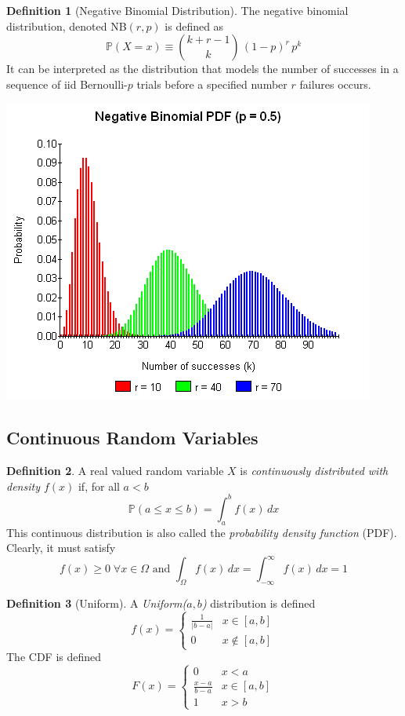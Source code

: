 \documentclass{article}
\theoremstyle{remark}
\theoremstyle{definition}
\newtheorem{definition}{Definition}[section]
\begin{document}
\begin{definition}[Negative Binomial Distribution]
The negative binomial distribution, denoted NB$(r, p)$ is defined as
\[\mathbb{P}(X = x) \equiv {{k+r-1} \choose k} \, (1-p)^r \, p^k\]
It can be interpreted as the distribution that models the number of successes in a sequence of iid Bernoulli-$p$ trials before a specified number $r$ failures occurs. 
\begin{center}
    \includegraphics[scale=0.5]{img/Negative_Binomial_Distribution_Model.png}
\end{center}

\end{definition}

\subsection{Continuous Random Variables}
\begin{definition}
A real valued random variable $X$ is \textit{continuously distributed with density $f(x)$} if, for all $a < b$
\[\mathbb{P}(a \leq x \leq b) = \int_a^b f(x) \, dx\]
This continuous distribution is also called the \textit{probability density function} (PDF). Clearly, it must satisfy
\[f(x) \geq 0 \; \forall x \in \Omega \text{ and } \int_{\Omega} f(x)\, dx = \int_{-\infty}^\infty f(x) \, dx = 1\]
\end{definition}

\begin{definition}[Uniform]
A \textit{Uniform($a, b$)} distribution is defined 
\[f(x) = \begin{cases}
\frac{1}{|b-a|} & x \in [a, b] \\
0 & x \not\in [a,b]
\end{cases}\]
The CDF is defined
\[F(x) = \begin{cases}
0 & x < a \\
\frac{x-a}{b-a} & x \in [a, b] \\
1 & x > b
\end{cases}\]
\end{definition}
\end{document}

